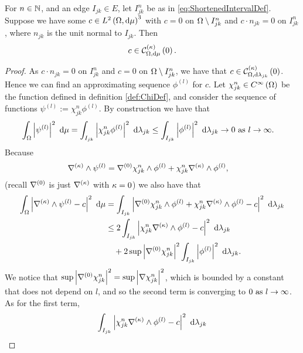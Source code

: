 \begin{lemma} \label{lem:kCurlZeroExtensionLemma}
	For $n\in\mathbb{N}$, and an edge $I_{jk}\in E$, let $I_{jk}^n$ be as in \eqref{eq:ShortenedIntervalDef}.
	Suppose we have some $c\in L^{2}\left( \Omega,\mathrm{d}\mu \right)^3$ with $c=0$ on $\Omega\setminus I_{jk}^n$ and $c\cdot n_{jk} = 0$ on $I_{jk}^n$, where $n_{jk}$ is the unit normal to $I_{jk}$.
	Then
	\begin{align*}
		c\in\mathcal{C}_{ \Omega, \mathrm{d}\mu}^{(\kappa)}\left( 0 \right).
	\end{align*}
\end{lemma}
\begin{proof}
	As $c\cdot n_{jk} = 0$ on $I_{jk}^n$ and $c=0$ on $\Omega\setminus I_{jk}^n$, we have that $c\in\mathcal{C}_{ \Omega, \mathrm{d}\lambda_{jk}}^{(\kappa)}\left( 0 \right)$.
	Hence we can find an approximating sequence $\phi^{(l)}$ for $c$.
	Let $\chi_{jk}^{n}\in C^{\infty}\left( \Omega \right)$ be the function defined in definition \ref{def:ChiDef}, and consider the sequence of functions $\psi^{(l)} := \chi_{jk}^n\phi^{(l)}$.
	By construction we have that
	\begin{align*}
		\int_{\Omega}\left\lvert \psi^{(l)} \right\rvert^2 \ \mathrm{d}\mu
		&= \int_{I_{jk}}\left\lvert \chi_{jk}^n\phi^{(l)} \right\rvert^2 \ \mathrm{d}\lambda_{jk}
		\leq \int_{I_{jk}}\left\lvert \phi^{(l)} \right\rvert^2 \ \mathrm{d}\lambda_{jk}
		\rightarrow 0 \ \text{as} \ l \rightarrow\infty.
	\end{align*}
	Because
	\begin{align*}
		\nabla_{}^{(\kappa)}\wedge\psi^{(l)} &= \nabla^{(0)}\chi_{jk}^n\wedge\phi^{(l)} + \chi_{jk}^n\nabla_{}^{(\kappa)}\wedge\phi^{(l)},
	\end{align*}
	(recall $\nabla^{(0)}$ is just $\nabla^{(\kappa)}{}$ with $\kappa=0$) we also have that
	\begin{align*}
		\int_{\Omega}\left\lvert \nabla_{}^{(\kappa)}\wedge\psi^{(l)} - c \right\rvert^2 \ \mathrm{d}\mu
		&= \int_{I_{jk}}\left\lvert \nabla^{(0)}\chi_{jk}^n\wedge\phi^{(l)} + \chi_{jk}^n\nabla_{}^{(\kappa)}\wedge\phi^{(l)} - c \right\rvert^2 \ \mathrm{d}\lambda_{jk} \\
		&\leq 2\int_{I_{jk}}\left\lvert \chi_{jk}^n\nabla_{}^{(\kappa)}\wedge\phi^{(l)} - c \right\rvert^2 \ \mathrm{d}\lambda_{jk} \\
		&\quad + 2\sup\left\lvert \nabla^{(0)}\chi_{jk}^n \right\rvert^2\int_{I_{jk}}\left\lvert \phi^{(l)} \right\rvert^2 \ \mathrm{d}\lambda_{jk}.
	\end{align*}
	We notice that $\sup\left\lvert \nabla^{(0)}\chi_{jk}^n \right\rvert^2 = \sup\left\lvert \nabla\chi_{jk}^n \right\rvert^2$, which is bounded by a constant that does not depend on $l$, and so the second term is converging to $0 \ \text{as} \ l \rightarrow\infty$.
	As for the first term,
	\begin{align*}
		\integral{I_{jk}}{\abs{\chi_{jk}^n\kcurl{}\phi^{(l)} - c}^2}{\lambda_{jk}}

\end{align*}
\end{proof}
